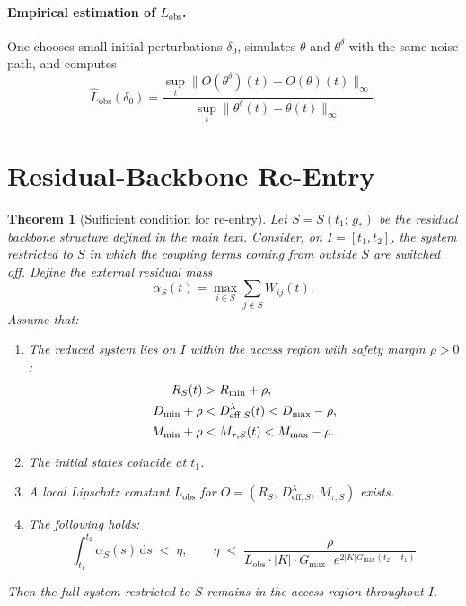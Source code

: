 \documentclass[11pt]{article}
\theoremstyle{plain}
\newtheorem{theorem}{Theorem}[section]
\theoremstyle{definition}
\theoremstyle{remark}
\newcommand{\Rmin}{R_{\min}}
\newcommand{\Dmin}{D_{\min}}
\newcommand{\Dmax}{D_{\max}}
\newcommand{\Mmin}{M_{\min}}
\newcommand{\Mmax}{M_{\max}}
\newcommand{\Gmax}{G_{\max}}
\newcommand{\Lobs}{L_{\mathrm{obs}}}
\begin{document}
\paragraph{Empirical estimation of $\Lobs$.}
One chooses small initial perturbations $\delta_0$, simulates $\theta$ and $\theta^{\delta}$ with the same noise path, and computes
\begin{equation}
\hat{L}_{\mathrm{obs}}(\delta_0) = \frac{\sup_t \|O(\theta^{\delta})(t) - O(\theta)(t)\|_{\infty}}{\sup_t \|\theta^{\delta}(t) - \theta(t)\|_{\infty}}.
\end{equation}


\section{Residual-Backbone Re-Entry}

\begin{theorem}[Sufficient condition for re-entry]
\label{satz:reentry}
Let $S = S(t_1;\,g_*)$ be the residual backbone structure defined in the main text. Consider, on $I = [t_1,t_2]$, the system restricted to $S$ in which the coupling terms coming from outside $S$ are switched off. Define the external residual mass
\begin{equation}
\alpha_S(t) = \max_{i \in S}\sum_{j \notin S} W_{ij}(t).
\end{equation}
Assume that:
\begin{enumerate}
\item The reduced system lies on $I$ within the access region with safety margin $\rho > 0$:
\begin{align}
R_S(t) &> \Rmin + \rho, \notag\\
\Dmin + \rho &< D_{\mathrm{eff},S}^{\lambda}(t) < \Dmax - \rho, \label{eq:marge}\\
\Mmin + \rho &< M_{\tau,S}(t) < \Mmax - \rho. \notag
\end{align}
\item The initial states coincide at $t_1$.
\item A local Lipschitz constant $\Lobs$ for $O = (R_S,\,D_{\mathrm{eff},S}^{\lambda},\,M_{\tau,S})$ exists.
\item The following holds:
\begin{equation}
\label{eq:eta}
\boxed{\;
\int_{t_1}^{t_2} \alpha_S(s)\,\mathrm{d}s \;<\; \eta, \qquad
\eta \;<\; \frac{\rho}{\Lobs \cdot |K| \cdot \Gmax \cdot e^{2|K|\Gmax(t_2 - t_1)}}
\;}
\end{equation}
\end{enumerate}
Then the full system restricted to $S$ remains in the access region throughout $I$.
\end{theorem}
\end{document}
